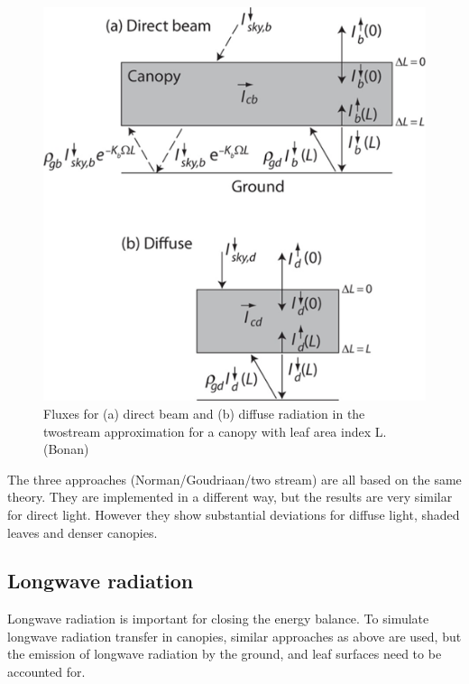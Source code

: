 \documentclass[
  12pt,
  oneside]{book}
\begin{document}
\begin{figure}

{\centering \includegraphics[width=0.8\linewidth]{figures/chap3/f321_two_stream} 

}

\caption{Fluxes for (a) direct beam and (b) diffuse radiation in the twostream approximation for a canopy with leaf area index L.(Bonan)}\label{fig:f321}
\end{figure}

The three approaches (Norman/Goudriaan/two stream) are all based on the same theory. They are implemented in a different way, but the results are very similar for direct light. However they show substantial deviations for diffuse light, shaded leaves and denser canopies.

\hypertarget{longwave-radiation}{%
\subsection{Longwave radiation}\label{longwave-radiation}}

Longwave radiation is important for closing the energy balance. To simulate longwave radiation transfer in canopies, similar approaches as above are used, but the emission of longwave radiation by the ground, and leaf surfaces need to be accounted for.
\end{document}
